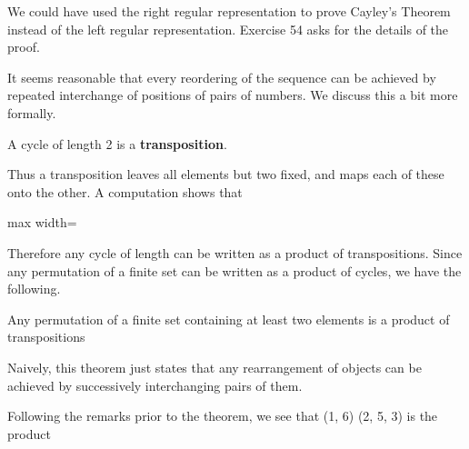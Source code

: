 \documentclass[11pt,oneside]{article}
\begin{document}
\begin{BookBody}
\noindent We could have used the right regular representation to prove Cayley’s Theorem instead of the left regular representation. Exercise 54 asks for the details of the proof.


\noindent It seems reasonable that every reordering of the sequence  can be achieved by repeated interchange of positions of pairs of numbers. We discuss this a bit more formally.

 A cycle of length 2 is a\textbf{ transposition}. \BookEnd{\blacksquare}

Thus a transposition leaves all elements but two fixed, and maps each of these onto the other. A computation shows that

\begin{center}\begin{adjustbox}{max width=\linewidth}\end{adjustbox}\end{center}

\noindent Therefore any cycle of length  can be written as a product of  transpositions. Since any permutation of a finite set can be written as a product of cycles, we have the following.

 Any permutation of a finite set containing at least two elements is a product of transpositions\BookEnd{\blacklozenge}

Naively, this theorem just states that any rearrangement of  objects can be achieved by successively interchanging pairs of them.

 Following the remarks prior to the theorem, we see that (1, 6) (2, 5, 3) is the product

\end{BookBody}

\BookNarrativetrue
\end{document}

